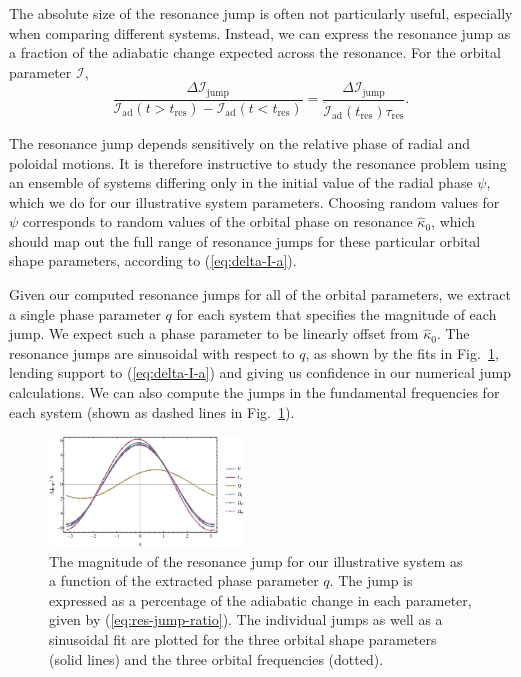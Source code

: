 \documentclass[aps,prd,amsfonts,amssymb,amsmath,nofootinbib,reprint,showpacs,superscriptaddress,twocolumn]{revtex4}
\newcommand{\eqnref}[1]{(\ref{eq:#1})}
\newcommand{\figref}[1]{Fig.\ \ref{fig:#1}}
\begin{document}
The absolute size of the resonance jump is often not particularly useful, especially when comparing different systems. Instead, we can express the resonance jump as a fraction of the adiabatic change expected across the resonance. For the orbital parameter $\mathcal{I}$,
\begin{equation}
\label{eq:res-jump-ratio}
\frac{\Delta \mathcal{I}_\mathrm{jump}}{\mathcal{I}_\mathrm{ad}(t>t_\mathrm{res})-\mathcal{I}_\mathrm{ad}(t<t_\mathrm{res})} = \frac{\Delta \mathcal{I}_\mathrm{jump}}{\dot{\mathcal{I}}_\mathrm{ad}(t_\mathrm{res})\tau_\mathrm{res}}.
\end{equation}

The resonance jump depends sensitively on the relative phase of radial and poloidal motions. It is therefore instructive to study the resonance problem using an ensemble of systems differing only in the initial value of the radial phase $\psi$, which we do for our illustrative system parameters. Choosing random values for $\psi$ corresponds to random values of the orbital phase on resonance $\widehat{\kappa}_0$, which should map out the full range of resonance jumps for these particular orbital shape parameters, according to \eqnref{delta-I-a}.

Given our computed resonance jumps for all of the orbital parameters, we extract a single phase parameter $q$ for each system that specifies the magnitude of each jump. We expect such a phase parameter to be linearly offset from $\widehat{\kappa}_0$. The resonance jumps are sinusoidal with respect to $q$, as shown by the fits in \figref{resjump-vs-q}, lending support to \eqnref{delta-I-a} and giving us confidence in our numerical jump calculations. We can also compute the jumps in the fundamental frequencies for each system (shown as dashed lines in \figref{resjump-vs-q}).

\begin{figure}[htbp]
\centering
\includegraphics[width=0.46\textwidth]{Fig_jump_vs_q}
\caption{\label{fig:resjump-vs-q}The magnitude of the resonance jump for our illustrative system as a function of the extracted phase parameter $q$. The jump is expressed as a percentage of the adiabatic change in each parameter, given by \eqnref{res-jump-ratio}. The individual jumps as well as a sinusoidal fit are plotted for the three orbital shape parameters (solid lines) and the three orbital frequencies (dotted).}
\end{figure}
\end{document}
